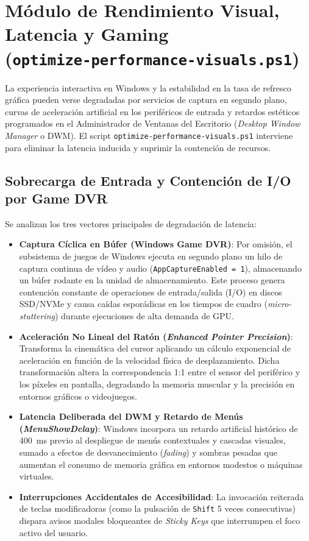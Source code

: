 \documentclass[12pt,a4paper]{report}
\begin{document}
\section[Módulo de Rendimiento Visual y Gaming]{Módulo de Rendimiento Visual, Latencia y Gaming\\ \large(\texttt{optimize-performance-visuals.ps1})}
La experiencia interactiva en Windows y la estabilidad en la tasa de refresco gráfica pueden verse degradadas por servicios de captura en segundo plano, curvas de aceleración artificial en los periféricos de entrada y retardos estéticos programados en el Administrador de Ventanas del Escritorio (\textit{Desktop Window Manager} o DWM). El script \texttt{optimize-performance-visuals.ps1} interviene para eliminar la latencia inducida y suprimir la contención de recursos.

\subsection{Sobrecarga de Entrada y Contención de I/O por Game DVR}
Se analizan los tres vectores principales de degradación de latencia:
\begin{itemize}
    \item \textbf{Captura Cíclica en Búfer (Windows Game DVR)}: Por omisión, el subsistema de juegos de Windows ejecuta en segundo plano un hilo de captura continua de vídeo y audio (\texttt{AppCaptureEnabled = 1}), almacenando un búfer rodante en la unidad de almacenamiento. Este proceso genera contención constante de operaciones de entrada/salida (I/O) en discos SSD/NVMe y causa caídas esporádicas en los tiempos de cuadro (\textit{micro-stuttering}) durante ejecuciones de alta demanda de GPU.
    \item \textbf{Aceleración No Lineal del Ratón (\textit{Enhanced Pointer Precision})}: Transforma la cinemática del cursor aplicando un cálculo exponencial de aceleración en función de la velocidad física de desplazamiento. Dicha transformación altera la correspondencia 1:1 entre el sensor del periférico y los píxeles en pantalla, degradando la memoria muscular y la precisión en entornos gráficos o videojuegos.
    \item \textbf{Latencia Deliberada del DWM y Retardo de Menús (\textit{MenuShowDelay})}: Windows incorpora un retardo artificial histórico de 400~ms previo al despliegue de menús contextuales y cascadas visuales, sumado a efectos de desvanecimiento (\textit{fading}) y sombras pesadas que aumentan el consumo de memoria gráfica en entornos modestos o máquinas virtuales.
    \item \textbf{Interrupciones Accidentales de Accesibilidad}: La invocación reiterada de teclas modificadoras (como la pulsación de \texttt{Shift} 5 veces consecutivas) dispara avisos modales bloqueantes de \textit{Sticky Keys} que interrumpen el foco activo del usuario.
\end{itemize}
\end{document}
